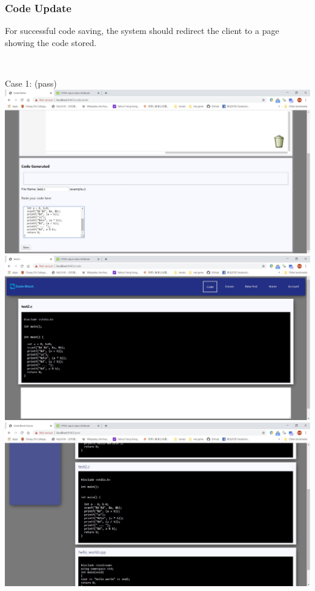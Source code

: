 \subsubsection{Code Update}
For successful code saving, the system should redirect the client to a page showing the code stored.

~

Case 1: (pass)\\
\includegraphics[scale=0.45]{Doc/Pics/case-6-2-1-1}\\
\includegraphics[scale=0.45]{Doc/Pics/case-6-2-1-2}\\
\includegraphics[scale=0.45]{Doc/Pics/case-6-2-1-3}\\

